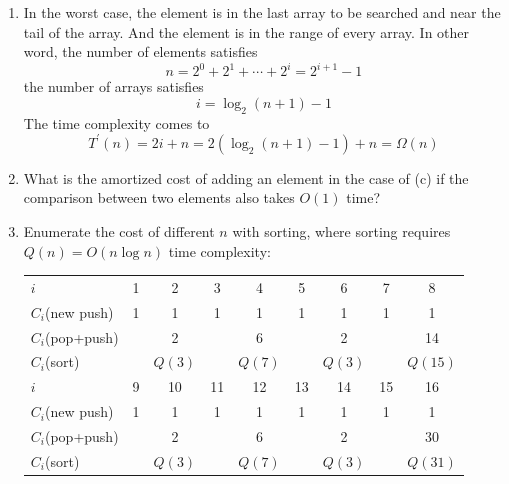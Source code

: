 \documentclass[12pt,a4paper]{article}
\makeatletter
\newtheorem*{solution}{Solution}
\theoremstyle{definition}
\renewenvironment{solution}[1][Solution] {\par\pushQED{\qed}\normalfont\topsep6\p@\@plus6\p@\relax\trivlist\item[\hskip\labelsep\bfseries#1\@addpunct{.}]\ignorespaces}{\popQED\endtrivlist\@endpefalse} \makeatother
\makeatother
\begin{document}
\begin{enumerate}
\begin{enumerate}
\begin{solution}
			In the worst case, the element is in the last array to be searched and near the tail of the array. And the element is in the range of every array. In other word, the number of elements satisfies
			\begin{equation*}
				n = 2^0 + 2^1 + \cdots + 2^i = 2^{i+1}-1
			\end{equation*}
			the number of arrays satisfies
			\begin{equation*}
				i = \log_2 (n+1)-1
			\end{equation*}
			The time complexity comes to
			\begin{equation*}
				T^\prime(n) = 2i + n = 2(\log_2(n+1)-1) + n = \Omega(n)
			\end{equation*}
		\end{solution}

		\item What is the amortized cost of adding an element in the case of (c) if the comparison between two elements also takes $O(1)$ time?
		
		\begin{solution}

			
			Enumerate the cost of different $n$ with sorting, where sorting requires $Q(n)=O(n\log n)$ time complexity:

			\begin{table}[h]
				\centering
				\begin{tabular}{l|cccccccc}
					\hline
					$i$ 			& 1 & 2 & 3 & 4 & 5 & 6 & 7 & 8 \\
					$C_i$(new push) 	& 1 & 1 & 1 & 1 & 1 & 1 & 1 & 1 \\
					$C_i$(pop+push)	&   & 2 &   & 6 &   & 2 &   & 14\\
					$C_i$(sort) 	& 	& $Q(3)$ & 	& $Q(7)$ &   & $Q(3)$ &   & $Q(15)$ \\
					\hline
					$i$ 			& 9 & 10& 11& 12& 13& 14& 15& 16\\
					$C_i$(new push) 	& 1 & 1 & 1 & 1 & 1 & 1 & 1 & 1 \\
					$C_i$(pop+push)	&   & 2 &   & 6 &   & 2 &   & 30\\
					$C_i$(sort)		& 	& $Q(3)$ & 	& $Q(7)$ & 	& $Q(3)$ & 	& $Q(31)$\\
					\hline
				\end{tabular}
			\end{table}


\end{solution}
\end{enumerate}
\end{enumerate}
\end{document}
